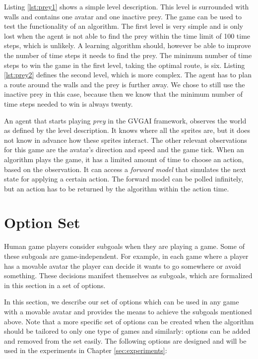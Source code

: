 Listing \ref{lst:prey1} shows a simple level description. This level is
surrounded with walls and contains one avatar and one inactive prey. 
The game can be used to test the functionality of an algorithm. The first level
is very simple and is only lost when the agent is not able to find the prey
within the time limit of 100 time steps, which is unlikely. A learning
algorithm should, however be able to improve the number of time steps it needs
to find the prey. The minimum number of time steps to win the game in the first
level, taking the optimal route, is six. Listing \ref{lst:prey2} defines the
second level, which is more complex. The agent has to plan a route around the
walls and the prey is further away. We chose to still use the inactive prey in
this case, because then we know that the minimum number of time steps needed to
win is always twenty.

An agent that starts playing \textit{prey} in the GVGAI framework, observes the
world as defined by the level description. It knows where all the sprites are,
but it does not know in advance how these sprites interact. The other relevant
observations for this game are the avatar's direction and speed and the game
tick. When an algorithm plays the game, it has a limited amount of time to
choose an action, based on the observation. It can access a \emph{forward
model} that simulates the next state for applying a certain action. The forward
model can be polled infinitely, but an action has to be returned by the
algorithm within the action time.

\section{Option Set}
Human game players consider subgoals when they are playing a game. Some of these
subgoals are game-independent. For example, in each game where a player has a
movable avatar the player can decide it wants to go somewhere or avoid
something. These decisions manifest themselves as subgoals, which are formalized
in this section in a set of options.  

In this section, we describe our set of options which can be used in any game
with a movable avatar and provides the means to achieve the subgoals mentioned
above. Note that a more specific set of options can be created when the
algorithm should be tailored to only one type of games and similarly: options
can be added and removed from the set easily. The following options are
designed and will be used in the experiments in Chapter \ref{sec:experiments}:

